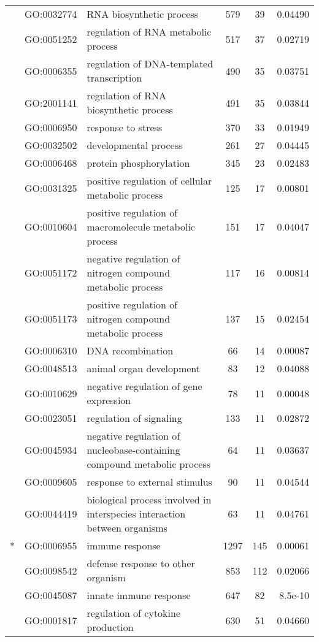 \documentclass[../main.tex]{subfiles}
\begin{document}
\begin{landscape}
\begin{longtable}{@{}lllccr@{}}
     & GO:0032774 & RNA biosynthetic process & 579 & 39 & 0.04490 \\
     & GO:0051252 & regulation of RNA metabolic process & 517 & 37 & 0.02719 \\
     & GO:0006355 & regulation of DNA-templated transcription & 490 & 35 & 0.03751 \\
     & GO:2001141 & regulation of RNA biosynthetic process & 491 & 35 & 0.03844 \\
     & GO:0006950 & response to stress & 370 & 33 & 0.01949 \\
     & GO:0032502 & developmental process & 261 & 27 & 0.04445 \\
     & GO:0006468 & protein phosphorylation & 345 & 23 & 0.02483 \\
     & GO:0031325 & positive regulation of cellular metabolic process & 125 & 17 & 0.00801 \\
     & GO:0010604 & positive regulation of macromolecule metabolic process & 151 & 17 & 0.04047 \\
     & GO:0051172 & negative regulation of nitrogen compound metabolic process & 117 & 16 & 0.00814 \\
     & GO:0051173 & positive regulation of nitrogen compound metabolic process & 137 & 15 & 0.02454 \\
     & GO:0006310 & DNA recombination & 66 & 14 & 0.00087 \\
     & GO:0048513 & animal organ development & 83 & 12 & 0.04088 \\
     & GO:0010629 & negative regulation of gene expression & 78 & 11 & 0.00048 \\
     & GO:0023051 & regulation of signaling & 133 & 11 & 0.02872 \\
     & GO:0045934 & negative regulation of nucleobase-containing compound metabolic process & 64 & 11 & 0.03637 \\
     & GO:0009605 & response to external stimulus & 90 & 11 & 0.04544 \\
     & GO:0044419 & biological process involved in interspecies interaction between organisms & 63 & 11 & 0.04761 \\* \midrule
    \multirow{35}{*}{\textbf{Mammalia}} & GO:0006955 & immune response & 1297 & 145 & 0.00061 \\
     & GO:0098542 & defense response to other organism & 853 & 112 & 0.02066 \\
     & GO:0045087 & innate immune response & 647 & 82 & 8.5e-10 \\
     & GO:0001817 & regulation of cytokine production & 630 & 51 & 0.04660 \\

\end{longtable}
\end{landscape}
\end{document}
